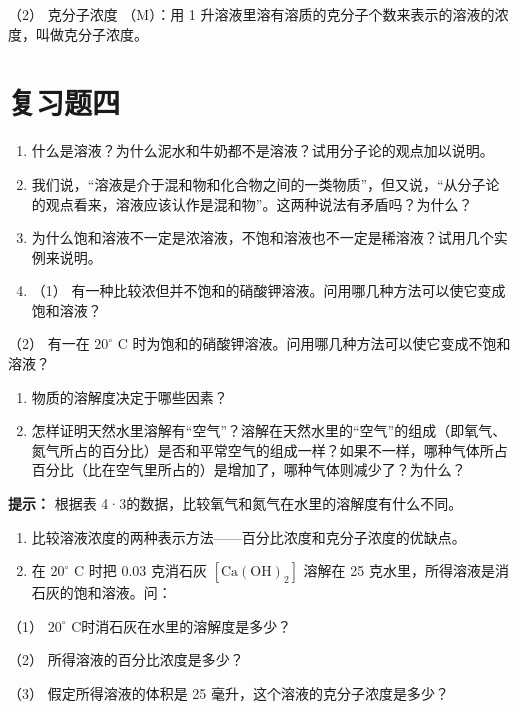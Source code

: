 （2） 克分子浓度 （M）：用 1
升溶液里溶有溶质的克分子个数来表示的溶液的浓度，叫做克分子浓度。

\section{复习题四}

\begin{enumerate}
\item
  什么是溶液？为什么泥水和牛奶都不是溶液？试用分子论的观点加以说明。
\item
  我们说，``溶液是介于混和物和化合物之间的一类物质''，但又说，``从分子论的观点看来，溶液应该认作是混和物''。这两种说法有矛盾吗？为什么？
\item
  为什么饱和溶液不一定是浓溶液，不饱和溶液也不一定是稀溶液？试用几个实例来说明。
\item
  （1）
  有一种比较浓但并不饱和的硝酸钾溶液。问用哪几种方法可以使它变成饱和溶液？
\end{enumerate}

（2） 有一在 \(20^{\circ}\) C
时为饱和的硝酸钾溶液。问用哪几种方法可以使它变成不饱和溶液？

\begin{enumerate}[start=5]
\item
  物质的溶解度决定于哪些因素？
\item
  怎样证明天然水里溶解有``空气''？溶解在天然水里的``空气''的组成（即氧气、氮气所占的百分比）是否和平常空气的组成一样？如果不一样，哪种气体所占百分比（比在空气里所占的）是增加了，哪种气体则减少了？为什么？
\end{enumerate}

\begin{shulihuadef}
\textbf{提示：} 根据表
4·3的数据，比较氧气和氮气在水里的溶解度有什么不同。
\end{shulihuadef}

\begin{enumerate}[start=7]
\item
  比较溶液浓度的两种表示方法------百分比浓度和克分子浓度的优缺点。
\item
  在 \(20^{\circ}\) C 时把 0.03 克消石灰
  \(\left[\mathrm{Ca(OH)}_{2}\right]\) 溶解在 25
  克水里，所得溶液是消石灰的饱和溶液。问：
\end{enumerate}

（1） \(20^{\circ}\) C时消石灰在水里的溶解度是多少？

（2） 所得溶液的百分比浓度是多少？

（3） 假定所得溶液的体积是 25 毫升，这个溶液的克分子浓度是多少？

